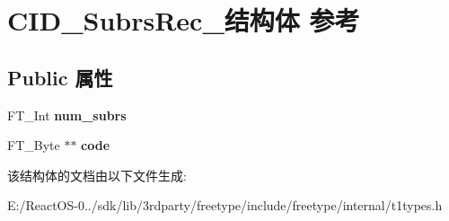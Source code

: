 \hypertarget{struct_c_i_d___subrs_rec__}{}\section{C\+I\+D\+\_\+\+Subrs\+Rec\+\_\+结构体 参考}
\label{struct_c_i_d___subrs_rec__}
\subsection*{Public 属性}
\begin{DoxyCompactItemize}
\item 
\mbox{\label{struct_c_i_d___subrs_rec___ad40f599bd12151a67baf6450959acd5a}} 
F\+T\+\_\+\+Int {\bfseries num\+\_\+subrs}
\item 
\mbox{\label{struct_c_i_d___subrs_rec___a1a4f0a4e514492fccaf81d7ede6c4e08}} 
F\+T\+\_\+\+Byte $\ast$$\ast$ {\bfseries code}
\end{DoxyCompactItemize}


该结构体的文档由以下文件生成\+:\begin{DoxyCompactItemize}
\item 
E\+:/\+React\+O\+S-\/0../sdk/lib/3rdparty/freetype/include/freetype/internal/t1types.\+h\end{DoxyCompactItemize}
